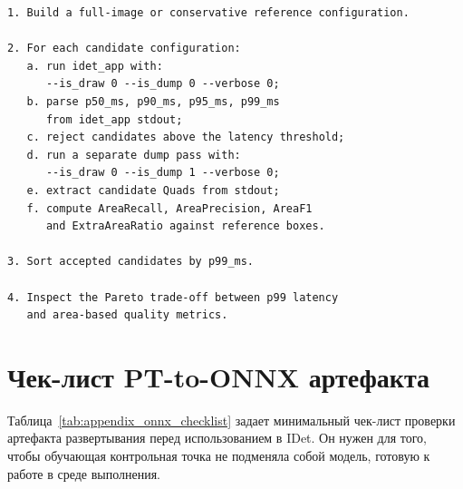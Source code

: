 \documentclass[12pt,a4paper,oneside,openany]{report}
\begin{document}
\begin{lstlisting}[caption={Алгоритмический протокол grid-search измерений},label={lst:appendix_benchmark_loop}]
1. Build a full-image or conservative reference configuration.

2. For each candidate configuration:
   a. run idet_app with:
      --is_draw 0 --is_dump 0 --verbose 0;
   b. parse p50_ms, p90_ms, p95_ms, p99_ms
      from idet_app stdout;
   c. reject candidates above the latency threshold;
   d. run a separate dump pass with:
      --is_draw 0 --is_dump 1 --verbose 0;
   e. extract candidate Quads from stdout;
   f. compute AreaRecall, AreaPrecision, AreaF1
      and ExtraAreaRatio against reference boxes.

3. Sort accepted candidates by p99_ms.

4. Inspect the Pareto trade-off between p99 latency
   and area-based quality metrics.
\end{lstlisting}

\clearpage
\renewcommand{\thesection}{C.\arabic{section}}
\setcounter{section}{0}
\setcounter{table}{0}
\setcounter{figure}{0}
\setcounter{lstlisting}{0}
\renewcommand{\thetable}{C.\arabic{table}}
\renewcommand{\thefigure}{C.\arabic{figure}}
\renewcommand{\thelstlisting}{C.\arabic{lstlisting}}
\renewcommand{\theHsection}{appC.\arabic{section}}
\renewcommand{\theHtable}{appC.\arabic{table}}
\renewcommand{\theHfigure}{appC.\arabic{figure}}
\renewcommand{\theHlstlisting}{appC.\arabic{lstlisting}}


\section{Чек-лист PT-to-ONNX артефакта}

Таблица~\ref{tab:appendix_onnx_checklist} задает минимальный чек-лист проверки артефакта развертывания перед использованием в IDet. Он нужен для того, чтобы обучающая контрольная точка не подменяла собой модель, готовую к работе в среде выполнения.
\end{document}
